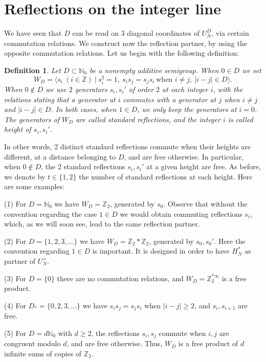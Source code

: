 \documentclass[11pt,a4paper]{article}
\newtheorem{defn}[thm]{Definition}
\begin{document}
\section{Reflections on the integer line}\label{reflection}

We have seen that $D$ can be read on 3 diagonal coordinates of $U_N^D$, via certain commutation relations. We construct now the reflection partner, by using the opposite commutation relations. Let us begin with the following definition:

\begin{defn}\label{w-group}
Let $D\subset\mathbb N_0$ be a nonempty additive semigroup. When $0\in D$ we set
\[
 W_D=\Big\langle s_i\ (i\in\mathbb Z)\ \Big|\ s_i^2=1,\ s_is_j=s_js_i\ \text{when }i\neq j,\ |i-j|\in D\Big\rangle.
\]
When $0\notin D$ we use $2$ generators $s_i,s_i'$ of order $2$ at each integer $i$, with the relations stating that a generator at $i$ commutes with a generator at $j$ when $i\neq j$ and $|i-j|\in D$. In both cases, when $1\in D$, we only keep the generators at $i=0$. The generators of $W_D$ are called standard reflections, and the integer $i$ is called height of $s_i,s_i'$.
\end{defn}

In other words, 2 distinct standard reflections commute when their heights are different, at a distance belonging to $D$, and are free otherwise. In particular, when $0\notin D$, the 2 standard reflections $s_i,s_i'$ at a given height are free. As before, we denote by $t\in\{1,2\}$ the number of standard reflections at each height. Here are some examples:

(1) For $D=\mathbb N_0$ we have $W_D=\mathbb Z_2$, generated by $s_0$. Observe that without the convention regarding the case $1\in D$ we would obtain commuting reflections $s_i$, which, as we will soon see, lead to the same reflection partner.

(2) For $D=\{1,2,3,\ldots\}$ we have $W_D=\mathbb Z_2*\mathbb Z_2$, generated by $s_0,s_0'$. Here the convention regarding $1\in D$ is important. It is designed in order to have $H_N^*$ as partner of $U_N^\times$.

(3) For $D=\{0\}$ there are no commutation relations, and $W_D=\mathbb Z_2^{*\infty}$ is a free product.

(4) For $D_*=\{0,2,3,\ldots\}$ we have $s_is_j=s_js_i$ when $|i-j|\geq2$, and $s_i,s_{i+1}$ are free.

(5) For $D=d\mathbb N_0$ with $d\geq2$, the reflections $s_i,s_j$ commute when $i,j$ are congruent modulo $d$, and are free otherwise. Thus, $W_D$ is a free product of $d$ infinite sums of copies of $\mathbb Z_2$.
\end{document}
